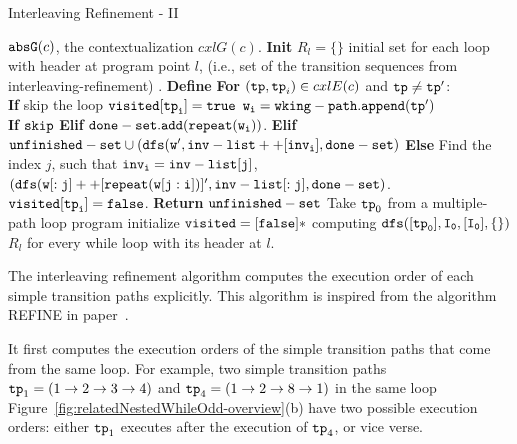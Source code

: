   \begin{algorithm}
    \caption{
    {Interleaving Refinement - II}
    \label{alg:prog-refine}
    }
    \begin{algorithmic}[1]
    \REQUIRE $\mathtt{abs}{\mathtt{G}}(c)$, the contextualization $cxlG(c)$.
    \STATE  \textbf{Init} 
    $R_l = \{\}$ initial set for each loop with header at program point $l$, (i.e., set of the transition sequences from interleaving-refinement) .
    \STATE \textbf{Define} 
    \STATE {}
    \STATE {}
    \STATE \quad \textbf{For} $(\mathtt{tp}, \mathtt{tp}_i) \in cxlE(c)$ and $\mathtt{tp} \neq \mathtt{tp}'$:
    \\
    \STATE \quad \quad \textbf{If}  skip the loop
    \STATE \quad \quad $\mathtt{visited[\mathtt{tp}_i]} = \mathtt{true}$
    \STATE \quad \quad $\mathtt{w_i = wking-path.append(\mathtt{tp}')}$
    \\
    \quad \quad {}
    \STATE \quad \quad \textbf{If}  $\mathtt{skip}$
    \STATE \quad \quad \textbf{Elif}  $\mathtt{done-set.add(\mathtt{repeat}(w_i))}$.
    \STATE \quad \quad \textbf{Elif}  
    $\mathtt{unfinished-set \cup (dfs(w', inv-list++[inv_i], done-set)}$
    \STATE \quad \quad \textbf{Else} 
    Find the index $j$, such that $\mathtt{inv_i = inv-list[j] }$,
    \STATE \quad \quad \quad
    $\mathtt{(dfs(w[:j]++[\mathtt{repeat}(w[j:i])]', inv-list[:j], done-set)}$.
    \STATE \quad \quad $\mathtt{visited[\mathtt{tp}_i]} = \mathtt{false}$.
    \STATE \quad \textbf{Return} $\mathtt{unfinished-set}$
    \STATE Take $\mathtt{tp}_0$ from a multiple-path loop program 
    \STATE initialize $\mathtt{visited} = [\mathtt{false}]*$
    \STATE computing $\mathtt{dfs([\mathtt{tp}_0], I_0, [I_0], \{\} )}$
    \RETURN $R_l$ for every while loop with its header at $l$.
    \end{algorithmic}
    \end{algorithm}



The interleaving refinement algorithm computes the execution order of each simple transition paths explicitly.
This algorithm is inspired from the algorithm REFINE in paper~\cite{GulwaniJK09}. 

It first computes the execution orders of
the simple transition paths that come from the same loop.
For example, two simple transition paths $\mathtt{tp}_1 = (1 \to 2 \to 3 \to 4)$ and 
$\mathtt{tp}_4 = (1 \to 2 \to 8 \to 1)$ in the same loop Figure~\ref{fig:relatedNestedWhileOdd-overview}(b) have two possible execution orders:
either $\mathtt{tp}_1$ executes after the execution of $\mathtt{tp}_4$, or vice verse.

